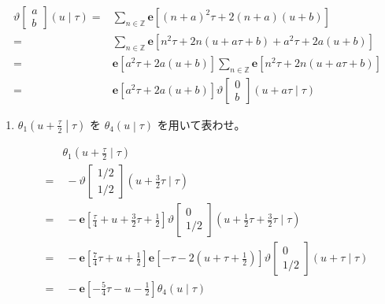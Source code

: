 \documentclass[12pt,b5paper]{ltjsarticle}
\begin{document}
\begin{enumerate}
\begin{enumerate}
              \dotfill

              \begin{align}
                \vartheta \begin{bmatrix} a \\ b \end{bmatrix} (u \mid \tau)
                =& \sum_{n\in\mathbb{Z}} \mathbf{e}
                 \left[ (n+a)^{2}\tau + 2(n+a)(u+b) \right]\\
                =& \sum_{n\in\mathbb{Z}} \mathbf{e}
                 \left[ n^{2}\tau +2n(u+a\tau+b)+ a^{2}\tau + 2a(u+b) \right]\\
                =& \mathbf{e}[a^{2}\tau + 2a(u+b) ] \sum_{n\in\mathbb{Z}}
                  \mathbf{e} [ n^{2}\tau +2n(u+a\tau+b)]\\
                =& \mathbf{e}[a^{2}\tau + 2a(u+b) ]
                \vartheta \begin{bmatrix} 0 \\ b \end{bmatrix} (u+a\tau \mid \tau)
              \end{align}

              \dotfill
             \begin{enumerate}
              \item $\displaystyle \theta_{1} \left(u+\frac{\tau}{2} \middle| \tau \right)$
                    を
                    $\displaystyle \theta_{4} \left(u \middle| \tau \right)$
                    を用いて表わせ。

                    \dotfill

                    \begin{align}
                     & \theta_{1}(u + \frac{\tau}{2} \mid \tau)\\
                        =&\; -\vartheta \begin{bmatrix} 1/2 \\ 1/2 \end{bmatrix} (u+\frac{3}{2}\tau \mid \tau)\\
                        =&\; -\mathbf{e}[\frac{\tau}{4}+u+\frac{3}{2}\tau+\frac{1}{2}]
                          \vartheta \begin{bmatrix} 0 \\ 1/2 \end{bmatrix} (u+\frac{1}{2}\tau+\frac{3}{2}\tau \mid \tau)\\
                        =&\; -\mathbf{e}[\frac{7}{4}\tau+u+\frac{1}{2}]
                     \mathbf{e}[-\tau-2(u+\tau+\frac{1}{2})]
                     \vartheta \begin{bmatrix} 0 \\ 1/2 \end{bmatrix} (u+\tau \mid \tau)\\
                        =&\; -\mathbf{e}[-\frac{5}{4}\tau-u-\frac{1}{2}]\theta_{4}(u\mid\tau)
                    \end{align}


\end{enumerate}
\end{enumerate}
\end{enumerate}
\end{document}
